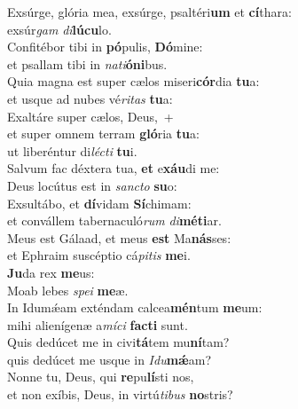 \evenverse Exsúrge, glória mea, exsúrge, psaltéri\textbf{um} et \textbf{cí}thara:~\*\\
\evenverse exsúr\textit{gam} \textit{di}\textbf{lú}\textbf{cu}lo.\\
\oddverse Confitébor tibi in \textbf{pó}pulis, \textbf{Dó}mine:~\*\\
\oddverse et psallam tibi in \textit{na}\textit{ti}\textbf{ó}\textbf{ni}bus.\\
\evenverse Quia magna est super cælos miseri\textbf{cór}dia \textbf{tu}a:~\*\\
\evenverse et usque ad nubes vé\textit{ri}\textit{tas} \textbf{tu}a:\\
\oddverse Exaltáre super cælos, Deus,~+\\
\oddverse  et super omnem terram \textbf{gló}ria \textbf{tu}a:~\*\\
\oddverse ut liberéntur di\textit{lé}\textit{cti} \textbf{tu}i.\\
\evenverse Salvum fac déxtera tua, \textbf{et} e\textbf{xáu}di me:~\*\\
\evenverse Deus locútus est in \textit{san}\textit{cto} \textbf{su}o:\\
\oddverse Exsultábo, et \textbf{dí}vidam \textbf{Sí}chimam:~\*\\
\oddverse et convállem tabernaculó\textit{rum} \textit{di}\textbf{mé}\textbf{ti}ar.\\
\evenverse Meus est Gálaad, et meus \textbf{est} Ma\textbf{nás}ses:~\*\\
\evenverse et Ephraim suscéptio cá\textit{pi}\textit{tis} \textbf{me}i.\\
\oddverse \textbf{Ju}da rex \textbf{me}us:~\*\\
\oddverse Moab lebes \textit{spe}\textit{i} \textbf{me}æ.\\
\evenverse In Idumǽam exténdam calcea\textbf{mén}tum \textbf{me}um:~\*\\
\evenverse mihi alienígenæ a\textit{mí}\textit{ci} \textbf{fa}\textbf{cti} sunt.\\
\oddverse Quis dedúcet me in civi\textbf{tá}tem mu\textbf{ní}tam?~\*\\
\oddverse quis dedúcet me usque in \textit{I}\textit{du}\textbf{mǽ}am?\\
\evenverse Nonne tu, Deus, qui \textbf{re}pu\textbf{lí}sti nos,~\*\\
\evenverse et non exíbis, Deus, in virtú\textit{ti}\textit{bus} \textbf{no}stris?\\
